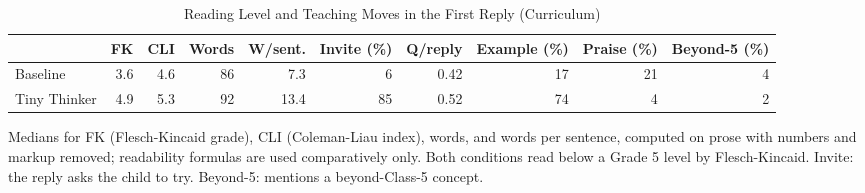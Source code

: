 \begin{table}[t]
\centering
\caption{Reading Level and Teaching Moves in the First Reply (Curriculum)}
\label{tab:pedagogy}
\footnotesize
\begin{tabular}{@{}lrrrrrrrrr@{}}
\toprule
 & FK & CLI & Words & W/sent. & Invite (\%) & Q/reply & Example (\%) & Praise (\%) & Beyond-5 (\%) \\
\midrule
Baseline & 3.6 & 4.6 & 86 & 7.3 & 6 & 0.42 & 17 & 21 & 4 \\
Tiny Thinker & 4.9 & 5.3 & 92 & 13.4 & 85 & 0.52 & 74 & 4 & 2 \\
\bottomrule
\end{tabular}
\par\smallskip\parbox{\linewidth}{\scriptsize Medians for FK (Flesch-Kincaid grade), CLI (Coleman-Liau index), words, and words per sentence, computed on prose with numbers and markup removed; readability formulas are used comparatively only. Both conditions read below a Grade 5 level by Flesch-Kincaid. Invite: the reply asks the child to try. Beyond-5: mentions a beyond-Class-5 concept.}
\end{table}
